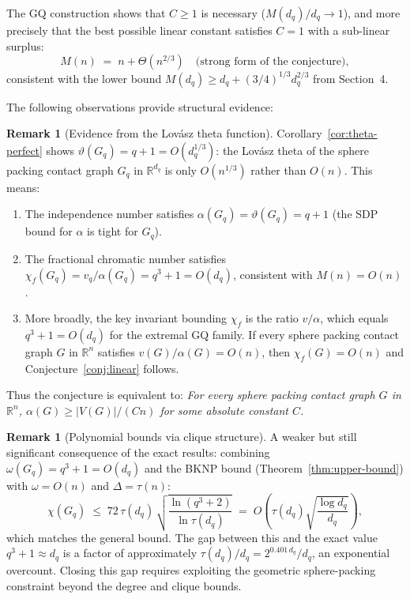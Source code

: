 \documentclass{article}
\theoremstyle{definition}
\newtheorem{remark}[theorem]{Remark}
\begin{document}
The GQ construction shows that $C\ge 1$ is necessary ($M(d_q)/d_q\to 1$), and more precisely that the best possible linear constant satisfies $C=1$ with a sub-linear surplus:
\[
  M(n) \;=\; n + \Theta(n^{2/3}) \quad\text{(strong form of the conjecture)},
\]
consistent with the lower bound $M(d_q)\ge d_q+(3/4)^{1/3}d_q^{2/3}$ from Section~4.

The following observations provide structural evidence:

\begin{remark}[Evidence from the Lov\'asz theta function]\label{rem:theta-evidence}
Corollary~\ref{cor:theta-perfect} shows $\vartheta(G_q)=q+1=O(d_q^{1/3})$: the Lov\'asz theta of the sphere packing contact graph $G_q$ in $\mathbb{R}^{d_q}$ is only $O(n^{1/3})$ rather than $O(n)$.  This means:
\begin{enumerate}
  \item The independence number satisfies $\alpha(G_q)=\vartheta(G_q)=q+1$ (the SDP bound for $\alpha$ is tight for $G_q$).
  \item The fractional chromatic number satisfies $\chi_f(G_q)=v_q/\alpha(G_q)=q^3+1=O(d_q)$, consistent with $M(n)=O(n)$.
  \item More broadly, the key invariant bounding $\chi_f$ is the ratio $v/\alpha$, which equals $q^3+1=O(d_q)$ for the extremal GQ family.  If every sphere packing contact graph $G$ in $\mathbb{R}^n$ satisfies $v(G)/\alpha(G)=O(n)$, then $\chi_f(G)=O(n)$ and Conjecture~\ref{conj:linear} follows.
\end{enumerate}
Thus the conjecture is equivalent to: \emph{For every sphere packing contact graph $G$ in $\mathbb{R}^n$, $\alpha(G)\ge|V(G)|/(Cn)$ for some absolute constant $C$.}
\end{remark}

\begin{remark}[Polynomial bounds via clique structure]\label{rem:poly-bound}
A weaker but still significant consequence of the exact results: combining $\omega(G_q)=q^3+1=O(d_q)$ and the BKNP bound (Theorem~\ref{thm:upper-bound}) with $\omega=O(n)$ and $\Delta=\tau(n)$:
\[
  \chi(G_q)\;\le\; 72\,\tau(d_q)\,\sqrt{\frac{\ln(q^3+2)}{\ln\tau(d_q)}} \;=\; O\!\left(\tau(d_q)\sqrt{\frac{\log d_q}{d_q}}\right),
\]
which matches the general bound.  The gap between this and the exact value $q^3+1\approx d_q$ is a factor of approximately $\tau(d_q)/d_q = 2^{0.401\,d_q}/d_q$, an exponential overcount.  Closing this gap requires exploiting the geometric sphere-packing constraint beyond the degree and clique bounds.
\end{remark}
\end{document}
